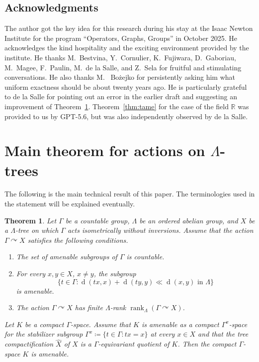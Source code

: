 \documentclass[12pt,nosumlimits,nonamelimits]{amsart}
\newtheorem{thm}{Theorem}
\theoremstyle{remark}
\theoremstyle{definition}
\newcommand{\IR}{\mathbb{R}}
\newcommand{\Ga}{\Gamma}
\newcommand{\La}{\Lambda}
\newcommand{\acts}{\curvearrowright}
\DeclareMathOperator{\rank}{rank}
\DeclareMathOperator{\dist}{d}
\begin{document}
\subsection*{Acknowledgments} 
The author got the key idea for this research 
during his stay at the Isaac Newton Institute 
for the program 
``Operators, Graphs, Groups'' in October 2025. 
He acknowledges the kind hospitality and the exciting
environment provided by the institute. 
He thanks M.~Bestvina, Y.~Cornulier, K.~Fujiwara, D.~Gaboriau, M.~Magee, 
F.~Paulin, M.~de la Salle, and Z.~Sela for fruitful and stimulating conversations. 
He also thanks M.~ Bo\.{z}ejko for persistently asking him 
what uniform exactness should be about twenty years ago.
He is particularly grateful to de la Salle for pointing out 
an error in the earlier draft and suggesting 
an improvement of Theorem~\ref{thmA:LaTree}. 
Theorem~\ref{thm:tame} for the case of the field $\IR$ 
was provided to us by GPT-5.6, but was also 
independently observed by de la Salle. 
%
%
\section{Main theorem for actions on $\La$-trees}
%
%
The following is the main technical result of this paper. 
The terminologies used in the statement will be explained eventually. 

\begin{thm}\label{thmA:LaTree}
Let $\Ga$ be a countable group, 
$\La$ be an ordered abelian group, 
and $X$ be a $\La$-tree 
on which $\Ga$ acts isometrically without inversions. 
Assume that the action $\Ga\acts X$ satisfies 
the following conditions. 
\begin{enumerate}
\item\label{cond:LaTreeCA}
The set of amenable subgroups of $\Ga$ is countable.
\item\label{cond:LaTreeAS}
For every $x,y\in X$, $x\neq y$,  
the subgroup 
\[
\{ t\in\Ga : \dist(tx,x)+\dist(ty,y) \ll \dist(x,y) \mbox{ in }\La\}
\]
is amenable. 
\item\label{cond:LaTreeFR} 
The action $\Ga\acts X$ has finite $\La$-rank 
$\rank_\La(\Ga\acts X)$. 
\end{enumerate}
Let $K$ be a compact $\Ga$-space. 
Assume that $K$ is amenable 
as a compact $\Ga^x$-space for the stabilizer subgroup 
$\Ga^x \coloneq \{ t\in \Ga : tx=x\}$ at every $x\in X$ 
and that the tree compactification $\hat{X}$ of $X$ is 
a $\Ga$-equivariant quotient of $K$. 
Then the compact $\Ga$-space $K$ is amenable. 
\end{thm}
%
%
\end{document}
